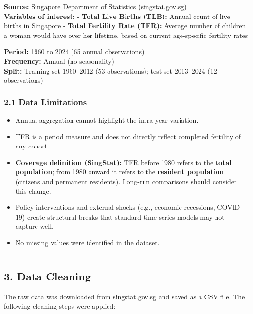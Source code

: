 \documentclass[
]{article}
\providecommand{\tightlist}{%
  \setlength{\itemsep}{0pt}\setlength{\parskip}{0pt}}
\begin{document}
\textbf{Source:} Singapore Department of Statistics (singstat.gov.sg)\\
\textbf{Variables of interest:} - \textbf{Total Live Births (TLB):}
Annual count of live births in Singapore - \textbf{Total Fertility Rate
(TFR):} Average number of children a woman would have over her lifetime,
based on current age-specific fertility rates

\textbf{Period:} 1960 to 2024 (65 annual observations)\\
\textbf{Frequency:} Annual (no seasonality)\\
\textbf{Split:} Training set 1960--2012 (53 observations); test set
2013--2024 (12 observations)

\subsubsection{2.1 Data Limitations}\label{data-limitations}

\begin{itemize}
\tightlist
\item
  Annual aggregation cannot highlight the intra-year variation.
\item
  TFR is a period measure and does not directly reflect completed
  fertility of any cohort.
\item
  \textbf{Coverage definition (SingStat):} TFR before 1980 refers to the
  \textbf{total population}; from 1980 onward it refers to the
  \textbf{resident population} (citizens and permanent residents).
  Long-run comparisons should consider this change.
\item
  Policy interventions and external shocks (e.g., economic recessions,
  COVID-19) create structural breaks that standard time series models
  may not capture well.
\item
  No missing values were identified in the dataset.
\end{itemize}

\begin{center}\rule{0.5\linewidth}{0.5pt}\end{center}

\subsection{3. Data Cleaning}\label{data-cleaning}

The raw data was downloaded from singstat.gov.sg and saved as a CSV
file. The following cleaning steps were applied:
\end{document}
